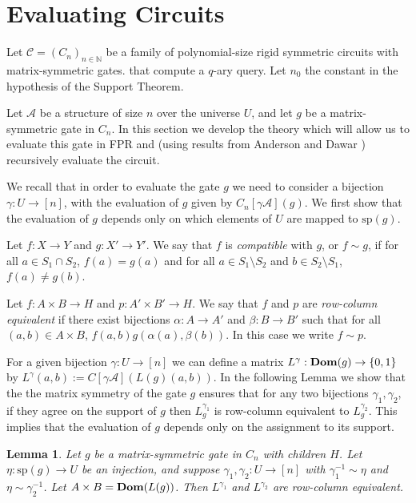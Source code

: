 \documentclass[12pt]{report}
\newtheorem{lem}[thm]{Lemma} \newtheorem{prop}[thm]{Proposition}
\newcommand{\dom}{\text{\textbf{Dom}}}
\newcommand{\consp}{\text{sp}}
\begin{document}
\section {Evaluating Circuits}
Let $\mathcal{C} = (C_n)_{n \in \mathbb{N}}$ be a family of polynomial-size
rigid symmetric circuits with matrix-symmetric gates. that compute a $q$-ary
query. Let $n_0$ the constant in the hypothesis of the Support Theorem.

Let $\mathcal{A}$ be a structure of size $n$ over the universe $U$, and let $g$
be a matrix-symmetric gate in $C_n$. In this section we develop the theory which
will allow us to evaluate this gate in FPR and (using results from Anderson and
Dawar \cite{}) recursively evaluate the circuit.

We recall that in order to evaluate the gate $g$ we need to consider a bijection
$\gamma: U \rightarrow [n]$, with the evaluation of $g$ given by $C_n[\gamma
\mathcal{A}](g)$. We first show that the evaluation of $g$ depends only on which
elements of $U$ are mapped to $\consp(g)$.

\begin{definition}
  Let $f: X \rightarrow Y$ and $g : X' \rightarrow Y'$. We say that $f$ is
  \emph{compatible} with $g$, or $f \sim g$, if for all $a \in S_1 \cap S_2$,
  $f(a) = g(a)$ and for all $a \in S_1 \setminus S_2$ and $b \in S_2 \setminus
  S_1$, $f(a) \neq g(b)$.
\end{definition}

\begin{definition}
  Let $f: A \times B \rightarrow H$ and $p: A' \times B' \rightarrow H$. We say
  that $f$ and $p$ are \emph{row-column equivalent} if there exist bijections
  $\alpha: A \rightarrow A'$ and $\beta: B \rightarrow B'$ such that for all
  $(a, b) \in A \times B$, $f(a,b)g(\alpha(a), \beta(b))$. In this case we write
  $f \sim p$.
\end{definition}

For a given bijection $\gamma: U \rightarrow [n]$ we can define a matrix
$L^{\gamma} : \dom (g) \rightarrow \{0,1\}$ by $L^{\gamma} (a,b) := C[\gamma
\mathcal{A}](L(g)(a,b))$. In the following Lemma we show that the the matrix
symmetry of the gate $g$ ensures that for any two bijections $\gamma_1,
\gamma_2$, if they agree on the support of $g$ then $L^{\gamma_1}_g$ is
row-column equivalent to $L^{\gamma_2}_g$. This implies that the evaluation of
$g$ depends only on the assignment to its support.

\begin{lem}
  Let $g$ be a matrix-symmetric gate in $C_n$ with children $H$. Let $\eta:
  \consp(g) \rightarrow U$ be an injection, and suppose $\gamma_1, \gamma_2: U
  \rightarrow [n]$ with $\gamma^{-1}_1 \sim \eta$ and $\eta \sim \gamma^{-1}_2$.
  Let $A \times B = \dom (L(g))$. Then $L^{\gamma_1}$ and $L^{\gamma_2}$ are
  row-column equivalent.
\end{lem}
\end{document}
